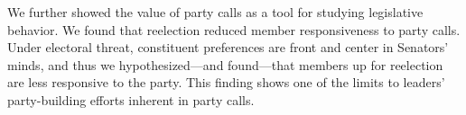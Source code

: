 \documentclass[12pt]{article}
\begin{document}
We further showed the value of party calls as a tool for studying legislative
behavior.
We found that reelection reduced member responsiveness to party calls.
Under electoral threat, constituent preferences are front and center in
Senators' minds, and thus we hypothesized---and found---that members up for
reelection are less responsive to the party.
This finding shows one of the limits to leaders' party-building efforts
inherent in party calls.






\end{document}
